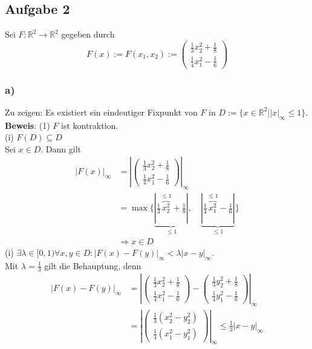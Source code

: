 \documentclass[11pt,a4paper,ngerman]{article}
\begin{document}
\subsection*{Aufgabe 2}
Sei $F: \mathbb{R}^2 \to \mathbb{R}^2$ gegeben durch 
$$ F(x) := F(x_1,x_2) := \left(\begin{array}{c}
\frac{1}{3}x_2^2+\frac{1}{8}\\
\frac{1}{4}x_1^2-\frac{1}{6}\end{array} \right)$$

\subsubsection*{a)}
Zu zeigen: Es existiert ein eindeutiger Fixpunkt von $F$ in 
$D := \{x\in \mathbb{R}^2 | \left|x\right|_\infty \leq 1 \}$. \\

\textbf{Beweis}: (1) $F$ ist kontraktion. \\
(i) $F(D) \subseteq D$ \\
Sei $x \in D$. Dann gilt
\begin{equation*}\begin{split}
\left|F(x)\right|_\infty &=  \left|\left(\begin{array}{c}
\frac{1}{3}x_2^2+\frac{1}{8}\\
\frac{1}{4}x_1^2-\frac{1}{6}\end{array} \right)\right|_\infty \\
     &= \max \{ \underbrace{|\frac{1}{3}\overbrace{x_2^2}^{\leq 1}+\frac{1}{8}|}_{\leq 1}, \quad 
                \underbrace{|\frac{1}{4}\overbrace{x_1^2}^{\leq 1}-\frac{1}{6} |}_{\leq 1} \} \\
     &\Rightarrow x \in D
\end{split}\end{equation*}
(i) $\exists \lambda \in [0,1) \forall x,y \in D: \left|F(x) - F(y)\right|_\infty < \lambda \left|x-y\right|_\infty$. \\
Mit $\lambda = \frac{1}{3}$ gilt die Behauptung, denn
\begin{equation*}\begin{split}
  \left|F(x) - F(y)\right|_\infty &= \left|
\left(\begin{array}{c}
\frac{1}{3}x_2^2+\frac{1}{8}\\
\frac{1}{4}x_1^2-\frac{1}{6}\end{array} \right)
-
\left(\begin{array}{c}
\frac{1}{3}y_2^2+\frac{1}{8}\\
\frac{1}{4}y_1^2-\frac{1}{6}\end{array} \right)
\right|_\infty \\
&= 
\left|\left(\begin{array}{c}
\frac{1}{3}(x_2^2- y_2^2)\\
\frac{1}{4}(x_1^2-y_1^2)\end{array} \right)
\right|_\infty
\leq \frac{1}{3}
\left| x - y \right|_\infty
\end{split}\end{equation*}
\end{document}
